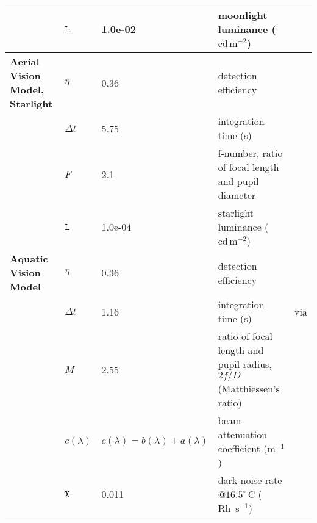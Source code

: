 \begin{tabular}{|L{3.5cm}|L{2cm}|L{2cm}|L{4.5cm}|L{4.5cm}|}
 &$\mathtt{L}$&1.0e-02&moonlight luminance ($\text{cd}\, \text{m}^{-2}$)&\cite{Midd52a}\\\hline
\textbf{Aerial Vision Model, Starlight}&$\eta$&0.36&detection efficiency&\cite{Nils14a}\\\hline
 &$\Delta t$&5.75&integration time (s)&\cite{Donn95a}\\\hline
 &$F$&2.1&f-number, ratio of focal length and pupil diameter&\cite{Mill79a}\\\hline
 &$\mathtt{L}$&1.0e-04&starlight luminance ($\text{cd}\, \text{m}^{-2}$)&\cite{Midd52a}\\\hline
\textbf{Aquatic Vision Model}&$\eta$&0.36&detection efficiency&\cite{Nils14a}\\\hline
 &$\Delta t$&1.16&integration time (s)&\cite{Donn95a} via \cite{Nils14a}\\\hline
 &$M$&2.55&ratio of focal length and pupil radius, $2f/D$ (Matthiessen's ratio)&\cite{Nils14a}\\\hline
 &$c(\lambda)$&$c(\lambda)=b(\lambda)+a(\lambda)$&beam attenuation coefficient ($\text{m}^{-1}$)&\cite{Midd52a}\\\hline
 &$\mathtt{X}$&0.011&dark noise rate @$16.5^{\circ} \, \text{C}$ ($\text{Rh } \,\text{s}^{-1}$)&\cite{Aho93a}\\\hline
\end{tabular}
